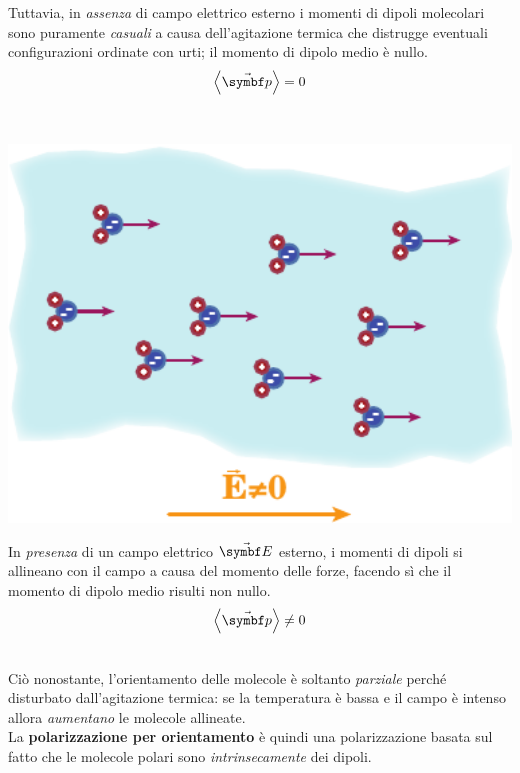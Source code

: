 \begin{minipage}{0.6\textwidth}
	Tuttavia, in \textit{assenza} di campo elettrico esterno i momenti di dipoli molecolari sono puramente \textit{casuali} a causa dell'agitazione termica che distrugge eventuali configurazioni ordinate con urti; il momento di dipolo medio è nullo.
	\begin{equation*}
		\left<\vba{p}\right>=0
	\end{equation*}
\end{minipage}\\
\begin{minipage}{0.39\textwidth}
	\begin{center}
		\includegraphics[width=1\textwidth]{images/chp6/chp6orientamento2.pdf}
	\end{center}
\end{minipage}\hspace{5pt}
\begin{minipage}{0.6\textwidth}
	In \textit{presenza} di un campo elettrico $\vba{E}$ esterno, i momenti di dipoli si allineano con il campo a causa del momento delle forze, facendo sì che il momento di dipolo medio risulti non nullo.
	\begin{equation*}
		\left<\vba{p}\right>\neq0
	\end{equation*}
\end{minipage}\\
Ciò nonostante, l'orientamento delle molecole è soltanto \textit{parziale} perché disturbato dall'agitazione termica: se la temperatura è bassa e il campo è intenso allora \textit{aumentano} le molecole allineate.\\
La \textbf{polarizzazione per orientamento} è quindi una polarizzazione basata sul fatto che le molecole polari sono \textit{intrinsecamente} dei dipoli.
